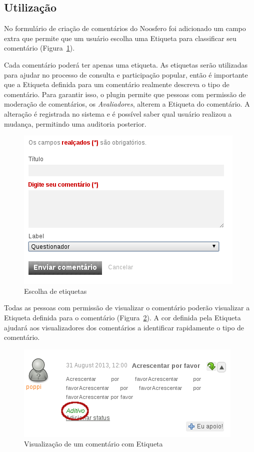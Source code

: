 \documentclass[11pt]{article}
\begin{document}
\subsection{Utilização}

No formulário de criação de comentários do Noosfero foi adicionado um
campo extra que permite que um usuário escolha uma Etiqueta para
classificar seu comentário (Figura~\ref{fig:comment-add}).

Cada comentário poderá ter apenas uma etiqueta. As etiquetas serão
utilizadas para ajudar no processo de consulta e participação popular,
então é importante que a Etiqueta definida para um comentário realmente
descreva o tipo de comentário. Para garantir isso, o plugin permite que
pessoas com permissão de moderação de comentários, os {\it Avaliadores},
alterem a Etiqueta do comentário. A alteração é registrada no sistema e
é possível saber qual usuário realizou a mudança, permitindo uma
auditoria posterior.

\begin{figure}[h]
\center
\includegraphics[scale=0.5]{comment-add.png}
\caption{Escolha de etiquetas}
\label{fig:comment-add}
\end{figure}


Todas as pessoas com permissão de visualizar o comentário poderão
visualizar a Etiqueta definida para o comentário
(Figura~\ref{fig:comment-view-label}). A cor definida pela Etiqueta
ajudará aos visualizadores dos comentários a identificar rapidamente o
tipo de comentário.

\begin{figure}[h]
\center
\includegraphics[scale=0.6]{comment-view-label.png}
\caption{Visualização de um comentário com Etiqueta}
\label{fig:comment-view-label}
\end{figure}
\end{document}
